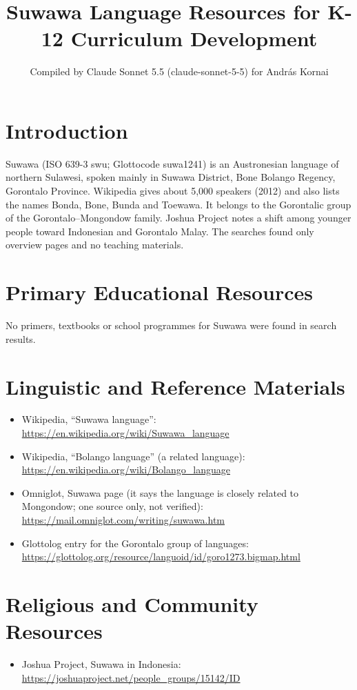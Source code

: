 \documentclass[12pt]{article}
\title{Suwawa Language Resources for K-12 Curriculum Development}
\author{Compiled by Claude Sonnet 5.5 (claude-sonnet-5-5) for Andr\'as Kornai}
\date{}
\begin{document}
\maketitle

\section{Introduction}
Suwawa (ISO 639-3 swu; Glottocode suwa1241) is an Austronesian language of northern Sulawesi, spoken mainly in Suwawa District, Bone Bolango Regency, Gorontalo Province. Wikipedia gives about 5,000 speakers (2012) and also lists the names Bonda, Bone, Bunda and Toewawa. It belongs to the Gorontalic group of the Gorontalo--Mongondow family. Joshua Project notes a shift among younger people toward Indonesian and Gorontalo Malay. The searches found only overview pages and no teaching materials.

\section{Primary Educational Resources}
No primers, textbooks or school programmes for Suwawa were found in search results.

\section{Linguistic and Reference Materials}
\begin{itemize}
\item Wikipedia, ``Suwawa language'': \url{https://en.wikipedia.org/wiki/Suwawa_language}
\item Wikipedia, ``Bolango language'' (a related language): \url{https://en.wikipedia.org/wiki/Bolango_language}
\item Omniglot, Suwawa page (it says the language is closely related to Mongondow; one source only, not verified): \url{https://mail.omniglot.com/writing/suwawa.htm}
\item Glottolog entry for the Gorontalo group of languages: \url{https://glottolog.org/resource/languoid/id/goro1273.bigmap.html}
\end{itemize}

\section{Religious and Community Resources}
\begin{itemize}
\item Joshua Project, Suwawa in Indonesia: \url{https://joshuaproject.net/people_groups/15142/ID}
\end{itemize}
\end{document}
